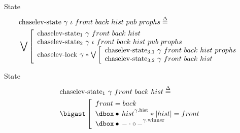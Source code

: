 
\begin{frame}{State}
\small
\begin{align*}
		&\mathrm{chaselev \mathhyphen state}\ \gamma\ \iota\ front\ back\ hist\ pub\ prophs
		\eqdef
	\\
		&\bigvee\left[\begin{array}{l}
				\mathrm{chaselev \mathhyphen state_1}\ \gamma\ front\ back\ hist
			\\
				\mathrm{chaselev \mathhyphen state_2}\ \gamma\ \iota\ front\ back\ hist\ pub\ prophs
			\\
				\mathrm{chaselev \mathhyphen lock}\ \gamma \iSep
				\bigvee\left[\begin{array}{l}
						\mathrm{chaselev \mathhyphen state_{3,1}}\ \gamma\ front\ back\ hist\ prophs
					\\
						\mathrm{chaselev \mathhyphen state_{3,2}}\ \gamma\ front\ back\ hist
				\end{array}\right.
		\end{array}\right.
\end{align*}
\end{frame}


\begin{frame}{State}
\begin{align*}
		&\mathrm{chaselev \mathhyphen state_1}\ \gamma\ front\ back\ hist
		\eqdef
	\\
		&\iBigsep\left[\begin{array}{l}
				front = back
			\\
				\iGhost{\gamma\mathrm{.hist}}{\iAuth{hist}} \iSep
				| hist | = front
			\\
				\iGhost{\gamma\mathrm{.winner}}{\iAuth{-} \cdot \iFrag{-}}
		\end{array}\right.
\end{align*}
\end{frame}


